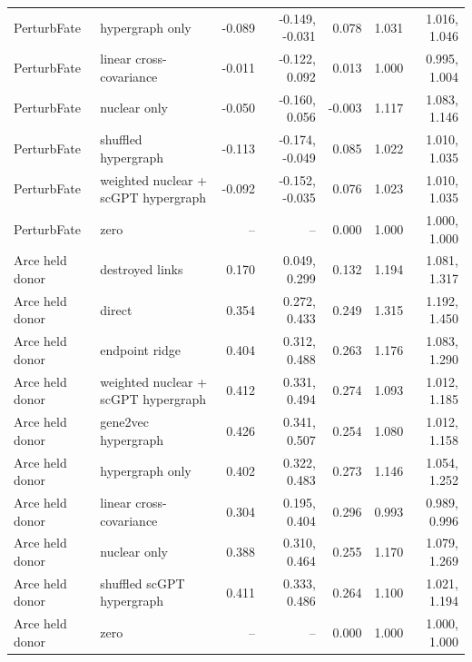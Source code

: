 \begin{longtable}{@{}p{2.5cm}p{5.0cm}rrrrr@{}}
PerturbFate & hypergraph only & -0.089 & -0.149, -0.031 & 0.078 & 1.031 & 1.016, 1.046 \\
PerturbFate & linear cross-covariance & -0.011 & -0.122, 0.092 & 0.013 & 1.000 & 0.995, 1.004 \\
PerturbFate & nuclear only & -0.050 & -0.160, 0.056 & -0.003 & 1.117 & 1.083, 1.146 \\
PerturbFate & shuffled hypergraph & -0.113 & -0.174, -0.049 & 0.085 & 1.022 & 1.010, 1.035 \\
PerturbFate & weighted nuclear + scGPT hypergraph & -0.092 & -0.152, -0.035 & 0.076 & 1.023 & 1.010, 1.035 \\
PerturbFate & zero & -- & -- & 0.000 & 1.000 & 1.000, 1.000 \\
Arce held donor & destroyed links & 0.170 & 0.049, 0.299 & 0.132 & 1.194 & 1.081, 1.317 \\
Arce held donor & direct & 0.354 & 0.272, 0.433 & 0.249 & 1.315 & 1.192, 1.450 \\
Arce held donor & endpoint ridge & 0.404 & 0.312, 0.488 & 0.263 & 1.176 & 1.083, 1.290 \\
Arce held donor & weighted nuclear + scGPT hypergraph & 0.412 & 0.331, 0.494 & 0.274 & 1.093 & 1.012, 1.185 \\
Arce held donor & gene2vec hypergraph & 0.426 & 0.341, 0.507 & 0.254 & 1.080 & 1.012, 1.158 \\
Arce held donor & hypergraph only & 0.402 & 0.322, 0.483 & 0.273 & 1.146 & 1.054, 1.252 \\
Arce held donor & linear cross-covariance & 0.304 & 0.195, 0.404 & 0.296 & 0.993 & 0.989, 0.996 \\
Arce held donor & nuclear only & 0.388 & 0.310, 0.464 & 0.255 & 1.170 & 1.079, 1.269 \\
Arce held donor & shuffled scGPT hypergraph & 0.411 & 0.333, 0.486 & 0.264 & 1.100 & 1.021, 1.194 \\
Arce held donor & zero & -- & -- & 0.000 & 1.000 & 1.000, 1.000 \\
\bottomrule
\end{longtable}
